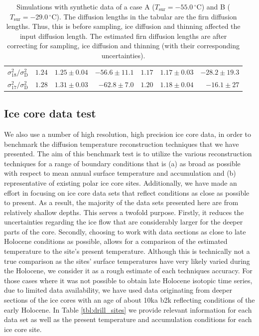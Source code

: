 \documentclass[11pt, draftcls, onecolumn]{IEEEtran} %
\numberwithin{equation}{section}
\numberwithin{table}{section}
\numberwithin{figure}{section}
\begin{document}
\begin{table}[]
\begin{tabular}{r r r r r r r }
		
		$\sigma^2_{18}/\sigma^2_\mathrm{D} $&$	1.24$& $1.25 \pm 0.04 $ 	& $-56.6 \pm 11.1$	&$1.17$	& 	$1.17 \pm 0.03$ 	& $-28.2 \pm 19.3$\\
		
		
		$\sigma^2_{17}/\sigma^2_\mathrm{D} $&$	1.28$& $ 1.31 \pm 0.03 $ 	& $  -62.8 \pm 7.0$	&$1.20$	& 	$1.18 \pm 0.04$ 	& $ -16.1 \pm 27 $\\
		\bottomrule		
	\end{tabular}
	\caption{Simulations with synthetic data of a case A ($T_{\mathrm{sur}} = -55.0 \,^{\circ} \mathrm{C}$) 
		and B ($T_{\mathrm{sur}} = -29.0 \,^{\circ} \mathrm{C}$). 
		The diffusion lengths in the tabular are the firn diffusion lengths.
		Thus, this is before sampling, ice diffusion and thinning affected the input diffusion length.
		The estimated firn diffusion lengths are after correcting for sampling, ice diffusion and thinning (with their corresponding uncertainties).  }
	\label{tbl:synthetic_diff_lens}
\end{table}





\subsection{Ice core data test} \label{sec:icecore_results}
We also use a number of high resolution, high precision ice core data, in order to benchmark the 
diffusion temperature reconstruction techniques that we have  presented.
The aim of this benchmark test is to utilize the various  reconstruction techniques for a range of
boundary conditions that is (a) as broad as possible with respect to mean annual surface temperature 
and accumulation and (b) representative of existing polar ice core sites.
Additionally, we have made an effort in focusing on ice core  data sets that reflect conditions as close as possible to 
present. As a result, the majority of the data sets presented here are from relatively shallow depths. 
This serves a twofold purpose. 
Firstly, it reduces the uncertainties regarding the ice flow that are considerably
larger for the deeper parts of the core. 
Secondly,  choosing to work with data sections as close to late Holocene
conditions as possible, allows for a comparison of the estimated temperature to the site's present temperature.
Although this is technically not a true comparison as the sites' surface temperatures have very likely
varied during the Holocene, we consider  it as a rough estimate of each techniques accuracy.
For those cases where it was not possible to obtain late Holocene isotopic time series, due to limited data availability,
we have used data originating from deeper sections of the ice cores with an age  
of about 10ka b2k reflecting conditions of  the early Holocene. In Table \ref{tbl:drill_sites} we provide relevant 
information for each data set as well as the present 
temperature and accumulation conditions for each ice core site.
\end{document}
